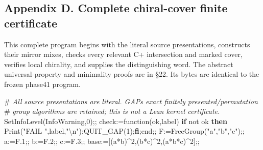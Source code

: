 \documentclass[
  10pt,
  letterpaper,
]{article}
\newenvironment{Shaded}{}{}
\newcommand{\BuiltInTok}[1]{\textcolor[rgb]{0.00,0.50,0.00}{#1}}
\newcommand{\CommentTok}[1]{\textcolor[rgb]{0.38,0.63,0.69}{\textit{#1}}}
\newcommand{\ConstantTok}[1]{\textcolor[rgb]{0.53,0.00,0.00}{#1}}
\newcommand{\ControlFlowTok}[1]{\textcolor[rgb]{0.00,0.44,0.13}{\textbf{#1}}}
\newcommand{\FloatTok}[1]{\textcolor[rgb]{0.25,0.63,0.44}{#1}}
\newcommand{\FunctionTok}[1]{\textcolor[rgb]{0.02,0.16,0.49}{#1}}
\newcommand{\NormalTok}[1]{#1}
\newcommand{\OperatorTok}[1]{\textcolor[rgb]{0.40,0.40,0.40}{#1}}
\newcommand{\StringTok}[1]{\textcolor[rgb]{0.25,0.44,0.63}{#1}}
\newcommand{\VariableTok}[1]{\textcolor[rgb]{0.10,0.09,0.49}{#1}}
\begin{document}
\subsection{Appendix D. Complete chiral-cover finite
certificate}\label{appendix-d.-complete-chiral-cover-finite-certificate}

This complete program begins with the literal source presentations,
constructs their mirror mixes, checks every relevant C+ intersection and
marked cover, verifies local chirality, and supplies the distinguishing
word. The abstract universal-property and minimality proofs are in §22.
Its bytes are identical to the frozen phase41 program.

\begin{Shaded}
\begin{Highlighting}[]
\NormalTok{\#}\CommentTok{ All source presentations are literal. GAP\textquotesingle{}s exact finitely presented/permutation}
\NormalTok{\#}\CommentTok{ group algorithms are retained; this is not a Lean kernel certificate.}
\BuiltInTok{SetInfoLevel}\NormalTok{(}\BuiltInTok{InfoWarning}\OperatorTok{,}\FloatTok{0}\NormalTok{)}\OperatorTok{;;}
\VariableTok{check}\OperatorTok{:=}\FunctionTok{function}\NormalTok{(}\VariableTok{ok}\OperatorTok{,}\VariableTok{label}\NormalTok{) }\ControlFlowTok{if} \ConstantTok{not} \VariableTok{ok} \ControlFlowTok{then} \BuiltInTok{Print}\NormalTok{(}\StringTok{"FAIL "}\OperatorTok{,}\VariableTok{label}\OperatorTok{,}\StringTok{"\textbackslash{}n"}\NormalTok{)}\OperatorTok{;}\VariableTok{QUIT\_GAP}\NormalTok{(}\FloatTok{1}\NormalTok{)}\OperatorTok{;}\ControlFlowTok{fi}\OperatorTok{;}\FunctionTok{end}\OperatorTok{;;}
\VariableTok{F}\OperatorTok{:=}\BuiltInTok{FreeGroup}\NormalTok{(}\StringTok{"a"}\OperatorTok{,}\StringTok{"b"}\OperatorTok{,}\StringTok{"c"}\NormalTok{)}\OperatorTok{;;} \VariableTok{a}\OperatorTok{:=}\VariableTok{F}\FloatTok{.1}\OperatorTok{;;} \VariableTok{b}\OperatorTok{:=}\VariableTok{F}\FloatTok{.2}\OperatorTok{;;} \VariableTok{c}\OperatorTok{:=}\VariableTok{F}\FloatTok{.3}\OperatorTok{;;}
\VariableTok{base}\OperatorTok{:=}\NormalTok{[(}\VariableTok{a}\OperatorTok{*}\VariableTok{b}\NormalTok{)}\OperatorTok{\^{}}\FloatTok{2}\OperatorTok{,}\NormalTok{(}\VariableTok{b}\OperatorTok{*}\VariableTok{c}\NormalTok{)}\OperatorTok{\^{}}\FloatTok{2}\OperatorTok{,}\NormalTok{(}\VariableTok{a}\OperatorTok{*}\VariableTok{b}\OperatorTok{*}\VariableTok{c}\NormalTok{)}\OperatorTok{\^{}}\FloatTok{2}\NormalTok{]}\OperatorTok{;;}

\end{Highlighting}
\end{Shaded}
\end{document}
